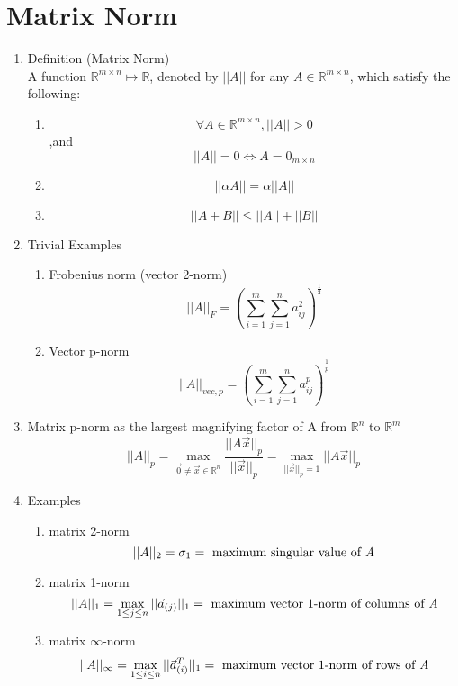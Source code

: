 \documentclass[11pt]{article}
\begin{document}
\section{Matrix Norm}
\begin{enumerate}
\item{Definition} (Matrix Norm)\\
A function $\mathbb{R}^{m \times n} \mapsto \mathbb{R}$, denoted by $||A||$ for any $A \in \mathbb{R}^{m \times n}$, which satisfy the following:
\begin{enumerate}
\item{$$\forall A \in \mathbb{R}^{m \times n}, ||A|| > 0 $$ ,and $$||A || = 0 \iff A = 0_{m \times n}$$}
\item{$$||\alpha A|| = \alpha ||A||$$}
\item{$$||A + B|| \leq ||A|| + ||B||$$}
\end{enumerate}
\item{Trivial Examples}
\begin{enumerate}
\item{Frobenius norm (vector 2-norm)}
$$||A||_{F} = \left(\sum_{i=1}^{m} \sum_{j=1}^{n} a_{ij}^2\right)^{\frac{1}{2}}$$
\item{Vector p-norm}
$$||A||_{vec, p} = \left(\sum_{i=1}^{m} \sum_{j=1}^{n} a_{ij}^p \right)^{\frac{1}{p}}$$
\end{enumerate}
\item{Matrix p-norm as the largest magnifying factor of A from $\mathbb{R}^{n}$ to $\mathbb{R}^{m}$}\\
$$||A||_{p} = \max_{\vec{0} \neq \vec{x} \in \mathbb{R}^{n}} \frac{||A \vec{x}||_{p}}{||\vec{x}||_{p}} = \max_{||\vec{x}||_{p} = 1} ||A \vec{x}||_{p}$$
\item{Examples}
\begin{enumerate}
\item{matrix 2-norm}
$$||A||_{2} =  \sigma_{1} = \text{ maximum singular value of \textit{A}}$$
\item{matrix 1-norm}
$$||A||_{1} = \max_{1 \leq j \leq n} ||\vec{a}_{(j)}||_{1} = \text{ maximum vector 1-norm of columns of \textit{A}}$$
\item{matrix $\infty$-norm}
$$||A||_{\infty} = \max_{1 \leq i \leq n} ||\vec{a}_{(i)}^{T}||_{1} = \text{ maximum vector 1-norm of rows of \textit{A}}$$
\end{enumerate}
\end{enumerate}

\newpage
\end{document}
